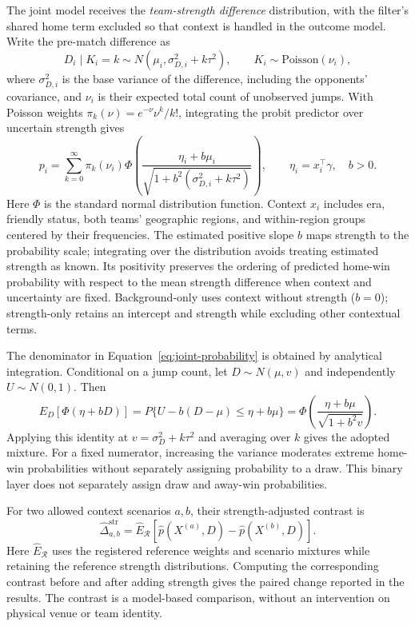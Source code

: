 The joint model receives the \emph{team-strength difference} distribution, with the filter's shared home term excluded so that context is handled in the outcome model. Write the pre-match difference as
\begin{equation}
 D_i\mid K_i=k\sim N(\mu_i,\sigma_{D,i}^2+k\tau^2),\qquad
 K_i\sim\mathrm{Poisson}(\nu_i),
 \label{eq:difference-mixture}
\end{equation}
where $\sigma_{D,i}^2$ is the base variance of the difference, including the opponents' covariance, and $\nu_i$ is their expected total count of unobserved jumps. With Poisson weights $\pi_k(\nu)=e^{-\nu}\nu^k/k!$, integrating the probit predictor over uncertain strength gives
\begin{equation}
 p_i=\sum_{k=0}^{\infty}\pi_k(\nu_i)
 \Phi\!\left(\frac{\eta_i+b\mu_i}{\sqrt{1+b^2(\sigma_{D,i}^2+k\tau^2)}}\right),
 \qquad \eta_i=x_i^\top\gamma,\quad b>0.
 \label{eq:joint-probability}
\end{equation}
Here $\Phi$ is the standard normal distribution function. Context $x_i$ includes era, friendly status, both teams' geographic regions, and within-region groups centered by their frequencies. The estimated positive slope $b$ maps strength to the probability scale; integrating over the distribution avoids treating estimated strength as known. Its positivity preserves the ordering of predicted home-win probability with respect to the mean strength difference when context and uncertainty are fixed. Background-only uses context without strength ($b=0$); strength-only retains an intercept and strength while excluding other contextual terms.

The denominator in Equation~\eqref{eq:joint-probability} is obtained by analytical integration. Conditional on a jump count, let $D\sim N(\mu,v)$ and independently $U\sim N(0,1)$. Then
\begin{equation}
 E_D[\Phi(\eta+bD)]
 =P\{U-b(D-\mu)\leq\eta+b\mu\}
 =\Phi\!\left(\frac{\eta+b\mu}{\sqrt{1+b^2v}}\right).
 \label{eq:probit-integral}
\end{equation}
Applying this identity at $v=\sigma_D^2+k\tau^2$ and averaging over $k$ gives the adopted mixture. For a fixed numerator, increasing the variance moderates extreme home-win probabilities without separately assigning probability to a draw. This binary layer does not separately assign draw and away-win probabilities.

For two allowed context scenarios $a,b$, their strength-adjusted contrast is
\begin{equation}
 \widehat\Delta^{\mathrm{str}}_{a,b}
 =\widehat E_{\mathcal R}\!\left[\widehat p(X^{(a)},D)-\widehat p(X^{(b)},D)\right].
 \label{eq:strength-contrast}
\end{equation}
Here $\widehat E_{\mathcal R}$ uses the registered reference weights and scenario mixtures while retaining the reference strength distributions. Computing the corresponding contrast before and after adding strength gives the paired change reported in the results. The contrast is a model-based comparison, without an intervention on physical venue or team identity.

